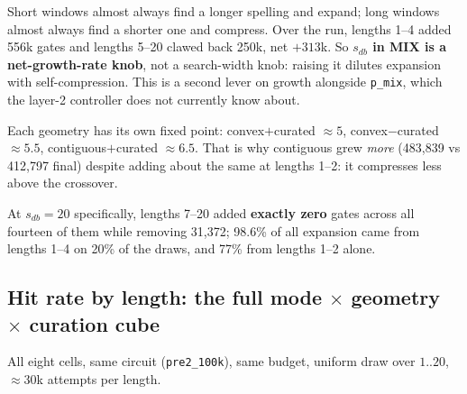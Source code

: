 \documentclass[11pt]{article}
\newcommand{\code}[1]{\texttt{#1}}
\begin{document}
Short windows almost always find a longer spelling and expand; long windows
almost always find a shorter one and compress. Over the run, lengths 1--4
added 556k gates and lengths 5--20 clawed back 250k, net $+313$k. So
\textbf{$s_{db}$ in MIX is a net-growth-rate knob}, not a search-width knob:
raising it dilutes expansion with self-compression. This is a second lever on
growth alongside \code{p\_mix}, which the layer-2 controller does not
currently know about.

Each geometry has its own fixed point: convex$+$curated $\approx5$,
convex$-$curated $\approx5.5$, contiguous$+$curated $\approx6.5$. That is why
contiguous grew \emph{more} (483{,}839 vs 412{,}797 final) despite adding about
the same at lengths 1--2: it compresses less above the crossover.

At $s_{db}=20$ specifically, lengths 7--20 added \textbf{exactly zero} gates
across all fourteen of them while removing 31{,}372; 98.6\% of all expansion
came from lengths 1--4 on 20\% of the draws, and 77\% from lengths 1--2 alone.

\subsection{Hit rate by length: the full mode $\times$ geometry $\times$ curation cube}

All eight cells, same circuit (\code{pre2\_100k}), same budget, uniform draw
over $1..20$, $\approx$30k attempts per length.
\end{document}
